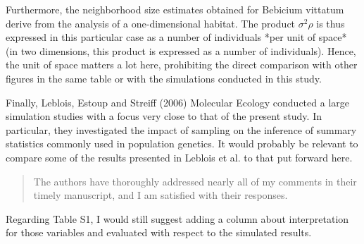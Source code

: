 {

}


\begin{point}{}
Furthermore, the neighborhood size estimates obtained for Bebicium vittatum derive from the analysis of a one-dimensional habitat. The product $\sigma^2 \rho$ is thus expressed in this particular case as a number of individuals *per unit of space* (in two dimensions, this product is expressed as a number of individuals). Hence, the unit of space matters a lot here, prohibiting the direct comparison with other figures in the same table or with the simulations conducted in this study.
\end{point}



\begin{point}{}
Finally, Leblois, Estoup and Streiff (2006) Molecular Ecology conducted a large simulation studies with a focus very close to that of the present study. In particular, they investigated the impact of sampling on the inference of summary statistics commonly used in population genetics. It would probably be relevant to compare some of the results presented in Leblois et al. to that put forward here.
\end{point}






\begin{quote}
The authors have thoroughly addressed nearly all of my comments in their timely manuscript, and I am satisfied with their responses.
\end{quote}

\begin{point}{}
Regarding Table S1, I would still suggest adding a column about interpretation for those variables and evaluated with respect to the simulated results.
\end{point}



